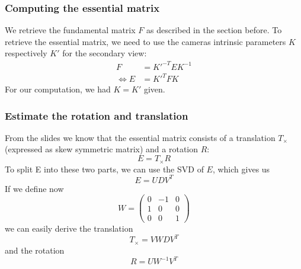 \documentclass{paper}
\begin{document}
\subsubsection{Computing the essential matrix}
We retrieve the fundamental matrix $F$ as described in the section before. To
retrieve the essential matrix, we need to use the cameras intrinsic parameters $K$ respectively $K'$ for the secondary view:
\begin{align}
	 F &= K'^{-T} E K^{-1} \\
	\Longleftrightarrow E &= K'^T F K
\end{align}
For our computation, we had $K = K'$ given. 
\subsubsection{Estimate the rotation and translation}

From the slides we know that the essential matrix consists of a translation $T_\times$ (expressed as skew symmetric matrix) and a rotation $R$:
\begin{equation}
	E = T_\times R
\end{equation}
To split E into these two parts, we can use the SVD of $E$, which gives us
\begin{equation}
	E = UDV^T
\end{equation}
If we define now
\begin{equation}
 W = \begin{pmatrix}
 	0 & -1 & 0 \\
 	1 & 0 & 0 \\
 	0 & 0 & 1
 \end{pmatrix}
\end{equation}
we can easily derive the translation
\begin{equation}
T_\times = V W D V^T
\end{equation}
and the rotation
\begin{equation}
R = U W^{-1} V^T
\end{equation}
\end{document}
